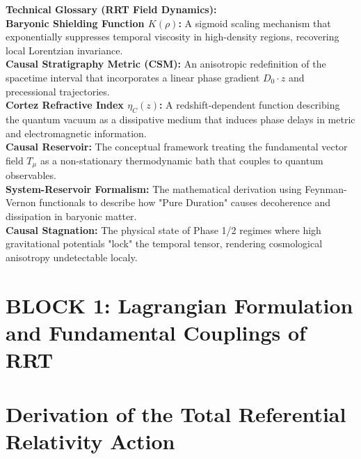 \documentclass[10pt, a4paper]{article}
\begin{document}
\vspace{3cm}
\noindent \textbf{Technical Glossary (RRT Field Dynamics):} \\
\textbf{Baryonic Shielding Function $K(\rho)$:} A sigmoid scaling mechanism that exponentially suppresses temporal viscosity in high-density regions, recovering local Lorentzian invariance. \\
\textbf{Causal Stratigraphy Metric (CSM):} An anisotropic redefinition of the spacetime interval that incorporates a linear phase gradient $D_0 \cdot z$ and precessional trajectories. \\
\textbf{Cortez Refractive Index $\eta_C(z)$:} A redshift-dependent function describing the quantum vacuum as a dissipative medium that induces phase delays in metric and electromagnetic information. \\
\textbf{Causal Reservoir:} The conceptual framework treating the fundamental vector field $T_\mu$ as a non-stationary thermodynamic bath that couples to quantum observables. \\
\textbf{System-Reservoir Formalism:} The mathematical derivation using Feynman-Vernon functionals to describe how "Pure Duration" causes decoherence and dissipation in baryonic matter. \\
\textbf{Causal Stagnation:} The physical state of Phase 1/2 regimes where high gravitational potentials "lock" the temporal tensor, rendering cosmological anisotropy undetectable localy.
\vspace*{\fill}

\newpage

\section*{BLOCK 1: Lagrangian Formulation and Fundamental Couplings of RRT}

\section{Derivation of the Total Referential Relativity Action}
\end{document}

